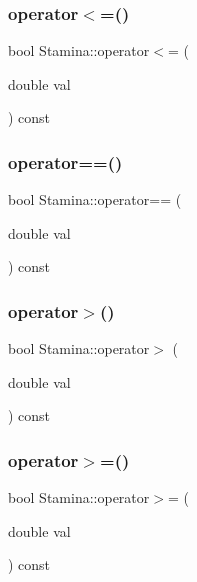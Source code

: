 \subsubsection{\texorpdfstring{operator$<$=()}{operator<=()}}
{\footnotesize\ttfamily bool Stamina\+::operator$<$= (\begin{DoxyParamCaption}\item[{double}]{val }\end{DoxyParamCaption}) const}

\mbox{\label{classStamina_aa3067e0326a250c295cfdba2eeb8f8b6_aa3067e0326a250c295cfdba2eeb8f8b6}} 
\subsubsection{\texorpdfstring{operator==()}{operator==()}}
{\footnotesize\ttfamily bool Stamina\+::operator== (\begin{DoxyParamCaption}\item[{double}]{val }\end{DoxyParamCaption}) const}

\mbox{\label{classStamina_aecb929dd6ebe322e92d714fd585413a8_aecb929dd6ebe322e92d714fd585413a8}} 
\subsubsection{\texorpdfstring{operator$>$()}{operator>()}}
{\footnotesize\ttfamily bool Stamina\+::operator$>$ (\begin{DoxyParamCaption}\item[{double}]{val }\end{DoxyParamCaption}) const}

\mbox{\label{classStamina_ae0b3f0fe7e80ecaa3e3dcacaa98f79e1_ae0b3f0fe7e80ecaa3e3dcacaa98f79e1}} 
\subsubsection{\texorpdfstring{operator$>$=()}{operator>=()}}
{\footnotesize\ttfamily bool Stamina\+::operator$>$= (\begin{DoxyParamCaption}\item[{double}]{val }\end{DoxyParamCaption}) const}

